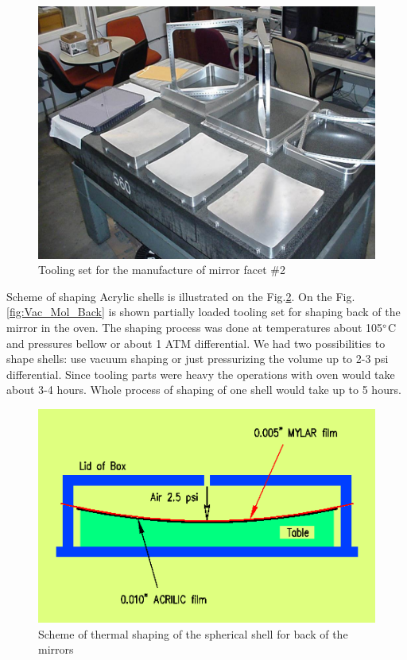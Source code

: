 \begin{figure}[h]
    \centering
    \includegraphics[width=1.0\linewidth]{Tool_on_tbl.jpg}
    \caption{Tooling set for the manufacture of mirror facet \#2}
    \label{fig:Tooling}
\end{figure}{}

\indent Scheme of shaping Acrylic shells is illustrated on the  Fig.\ref{fig:Shaping_new}. On the Fig.\ref{fig:Vac_Mol_Back} is shown partially loaded tooling set for shaping back of the mirror in the oven. The shaping process was done at temperatures about 105$\degree$C and pressures bellow or about 1 ATM differential. We had two possibilities to shape shells: use vacuum shaping or just pressurizing the volume up to 2-3 psi differential. Since tooling parts were heavy the operations with oven would take about 3-4 hours. Whole process of shaping of one shell would take up to 5 hours.

\begin{figure}[h]
    \centering
    \includegraphics[width=1.0\linewidth]{Shaping_new.png}
    \caption{Scheme of thermal shaping of the spherical shell for back of the mirrors}
    \label{fig:Shaping_new}
\end{figure}{}

